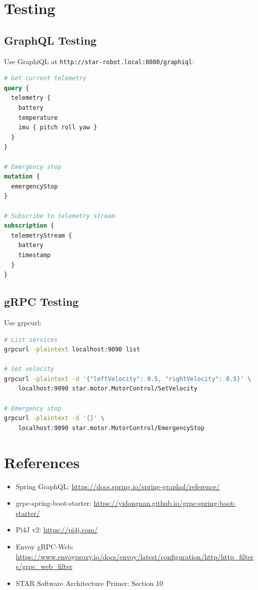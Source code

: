 \documentclass[11pt,letterpaper]{article}
\begin{document}
\section{Testing}

\subsection{GraphQL Testing}

Use GraphiQL at \texttt{http://star-robot.local:8080/graphiql}:

\begin{lstlisting}[language=GraphQL, caption=Sample GraphQL Queries]
# Get current telemetry
query {
  telemetry {
    battery
    temperature
    imu { pitch roll yaw }
  }
}

# Emergency stop
mutation {
  emergencyStop
}

# Subscribe to telemetry stream
subscription {
  telemetryStream {
    battery
    timestamp
  }
}
\end{lstlisting}

\subsection{gRPC Testing}

Use grpcurl:

\begin{lstlisting}[language=bash]
# List services
grpcurl -plaintext localhost:9090 list

# Set velocity
grpcurl -plaintext -d '{"leftVelocity": 0.5, "rightVelocity": 0.5}' \
    localhost:9090 star.motor.MotorControl/SetVelocity

# Emergency stop
grpcurl -plaintext -d '{}' \
    localhost:9090 star.motor.MotorControl/EmergencyStop
\end{lstlisting}

\section{References}

\begin{itemize}
    \item Spring GraphQL: \url{https://docs.spring.io/spring-graphql/reference/}
    \item grpc-spring-boot-starter: \url{https://yidongnan.github.io/grpc-spring-boot-starter/}
    \item Pi4J v2: \url{https://pi4j.com/}
    \item Envoy gRPC-Web: \url{https://www.envoyproxy.io/docs/envoy/latest/configuration/http/http_filters/grpc_web_filter}
    \item STAR Software Architecture Primer: Section 10
\end{itemize}
\end{document}
